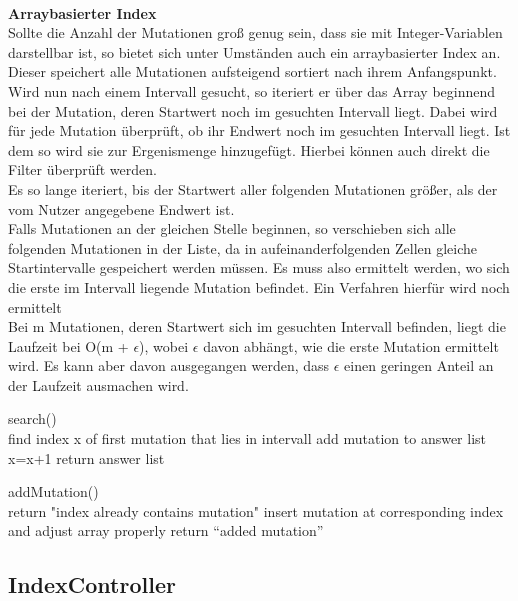 \documentclass{scrartcl}
\begin{document}
\newpage\hfill\\
\textbf{Arraybasierter Index}\\
Sollte die Anzahl der Mutationen groß genug sein, dass sie mit Integer-Variablen darstellbar ist, so bietet sich unter Umständen auch ein arraybasierter Index an.\\
Dieser speichert alle Mutationen aufsteigend sortiert nach ihrem Anfangspunkt.
Wird nun nach einem Intervall gesucht, so iteriert er über das Array beginnend bei der Mutation, deren Startwert noch im gesuchten Intervall liegt. Dabei wird für jede Mutation überprüft, ob ihr Endwert noch im gesuchten Intervall liegt. Ist dem so wird sie zur Ergenismenge hinzugefügt. Hierbei können auch direkt die Filter überprüft werden.\\
Es so lange iteriert, bis der Startwert aller folgenden Mutationen größer, als der vom Nutzer angegebene Endwert ist.\\
Falls Mutationen an der gleichen Stelle beginnen, so verschieben sich alle folgenden Mutationen in der Liste, da in aufeinanderfolgenden Zellen gleiche Startintervalle gespeichert werden müssen. Es muss also ermittelt werden, wo sich die erste im Intervall liegende Mutation befindet. Ein Verfahren hierfür wird noch ermittelt\\
Bei m Mutationen, deren Startwert sich im gesuchten Intervall befinden, liegt die Laufzeit bei O(m + $\epsilon$), wobei $\epsilon$ davon abhängt, wie die erste Mutation ermittelt wird. Es kann aber davon ausgegangen werden, dass $\epsilon$ einen geringen Anteil an der Laufzeit ausmachen wird.
\begin{algorithm}
search()\\{
find index x of first mutation that lies in intervall\;
{{
{add mutation to answer list\;}
}
x=x+1\;
}
return answer list\;}

\end{algorithm}


\begin{algorithm}
addMutation()\\{
{return "index already contains mutation"\;}
insert mutation at corresponding index and adjust array properly\;
return \enquote{added mutation}\;}
\end{algorithm}
\newpage
\subsection{IndexController}
\end{document}
